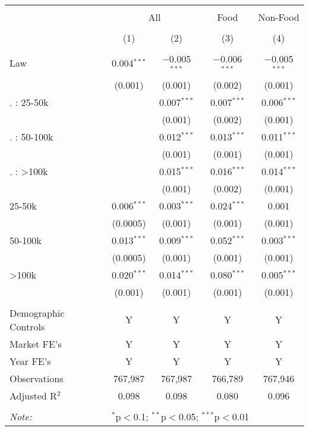 
\begin{table}[!htbp] \centering 
  \caption{} 
  \label{} 
\begin{tabular}{@{\extracolsep{5pt}}lcccc} 
\\[-1.8ex]\hline 
\hline \\[-1.8ex] 
 & \multicolumn{2}{c}{All} & Food & Non-Food \\ 
\\[-1.8ex] & (1) & (2) & (3) & (4)\\ 
\hline \\[-1.8ex] 
 Law & 0.004$^{***}$ & $-$0.005$^{***}$ & $-$0.006$^{***}$ & $-$0.005$^{***}$ \\ 
  & (0.001) & (0.001) & (0.002) & (0.001) \\ 
   . : 25-50k &  & 0.007$^{***}$ & 0.007$^{***}$ & 0.006$^{***}$ \\ 
  &  & (0.001) & (0.002) & (0.001) \\ 
   . : 50-100k &  & 0.012$^{***}$ & 0.013$^{***}$ & 0.011$^{***}$ \\ 
  &  & (0.001) & (0.001) & (0.001) \\ 
   . : >100k &  & 0.015$^{***}$ & 0.016$^{***}$ & 0.014$^{***}$ \\ 
  &  & (0.001) & (0.002) & (0.001) \\ 
  25-50k & 0.006$^{***}$ & 0.003$^{***}$ & 0.024$^{***}$ & 0.001 \\ 
  & (0.0005) & (0.001) & (0.001) & (0.001) \\ 
  50-100k & 0.013$^{***}$ & 0.009$^{***}$ & 0.052$^{***}$ & 0.003$^{***}$ \\ 
  & (0.0005) & (0.001) & (0.001) & (0.001) \\ 
  >100k & 0.020$^{***}$ & 0.014$^{***}$ & 0.080$^{***}$ & 0.005$^{***}$ \\ 
  & (0.001) & (0.001) & (0.001) & (0.001) \\ 
 \hline \\[-1.8ex] 
Demographic Controls & Y & Y & Y & Y \\ 
Market FE's & Y & Y & Y & Y \\ 
Year FE's & Y & Y & Y & Y \\ 
Observations & 767,987 & 767,987 & 766,789 & 767,946 \\ 
Adjusted R$^{2}$ & 0.098 & 0.098 & 0.080 & 0.096 \\ 
\hline 
\hline \\[-1.8ex] 
\textit{Note:}  & \multicolumn{4}{l}{$^{*}$p$<$0.1; $^{**}$p$<$0.05; $^{***}$p$<$0.01} \\ 
\end{tabular} 
\end{table} 

